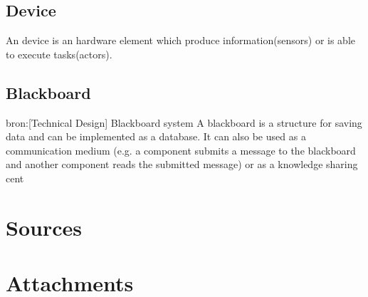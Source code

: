 \documentclass[12pt,a4paper]{report}
\begin{document}
\section{Device}
An device is an hardware element which produce information(sensors) or is able to execute tasks(actors).
\section{Blackboard}
bron:[Technical Design] Blackboard system
A blackboard is a structure for saving data and can be implemented as a database. It can also be used as a communication medium (e.g. a component submits a message to the blackboard and another component reads the submitted message) or as a knowledge sharing cent

\chapter{Sources}

\chapter{Attachments}



\end{document}
